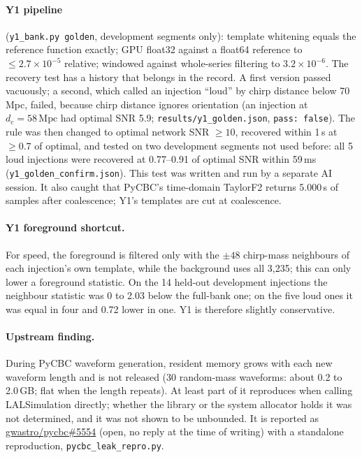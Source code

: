 \documentclass[11pt]{article}
\newcommand{\Mpc}{\ensuremath{\,\mathrm{Mpc}}}
\begin{document}
\paragraph{Y1 pipeline} (\texttt{y1\_bank.py golden}, development segments only): template whitening equals the
reference function exactly; GPU float32 against a float64 reference to $\leq 2.7\times10^{-5}$ relative; windowed
against whole-series filtering to $3.2\times10^{-6}$. The recovery test has a history that belongs in the record. A
first version passed vacuously; a second, which called an injection ``loud'' by chirp distance below 70\,Mpc, failed,
because chirp distance ignores orientation (an injection at $d_c = 58\Mpc$ had optimal SNR 5.9;
\texttt{results/y1\_golden.json}, \texttt{pass: false}). The rule was then changed to optimal network SNR $\geq 10$,
recovered within 1\,s at $\geq 0.7$ of optimal, and tested on two development segments not used before: all 5 loud
injections were recovered at 0.77--0.91 of optimal SNR within 59\,ms (\texttt{y1\_golden\_confirm.json}). This test
was written and run by a separate AI session. It also caught that PyCBC's time-domain TaylorF2 returns 5.000\,s of
samples after coalescence; Y1's templates are cut at coalescence.

\paragraph{Y1 foreground shortcut.} For speed, the foreground is filtered only with the $\pm48$ chirp-mass neighbours
of each injection's own template, while the background uses all 3,235; this can only lower a foreground statistic.
On the 14 held-out development injections the neighbour statistic was 0 to 2.03 below the full-bank one; on the five
loud ones it was equal in four and 0.72 lower in one. Y1 is therefore slightly conservative.

\paragraph{Upstream finding.} During PyCBC waveform generation, resident memory grows with each new waveform length
and is not released (30 random-mass waveforms: about 0.2 to 2.0\,GB; flat when the length repeats). At least part of
it reproduces when calling LALSimulation \cite{lalsuite} directly; whether the library or the system allocator holds
it was not determined, and it was not shown to be unbounded. It is reported as \href{https://github.com/gwastro/pycbc/issues/5554}{gwastro/pycbc\#5554} (open, no reply at
the time of writing) with a standalone reproduction, \texttt{pycbc\_leak\_repro.py}.
\end{document}
